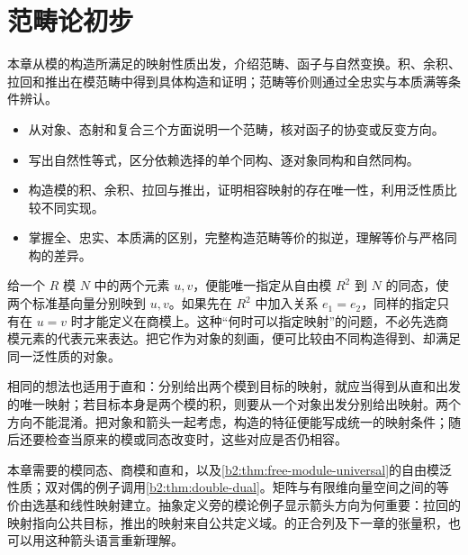 
\chapter{范畴论初步}
\label{b2:ch:05}

\begin{chapterabstract}
	本章从模的构造所满足的映射性质出发，介绍范畴、函子与自然变换。积、余积、拉回和推出在模范畴中得到具体构造和证明；范畴等价则通过全忠实与本质满等条件辨认。
\end{chapterabstract}

\begin{learninggoals}
	\begin{itemize}
		\item 从对象、态射和复合三个方面说明一个范畴，核对函子的协变或反变方向。
		\item 写出自然性等式，区分依赖选择的单个同构、逐对象同构和自然同构。
		\item 构造模的积、余积、拉回与推出，证明相容映射的存在唯一性，利用泛性质比较不同实现。
		\item 掌握全、忠实、本质满的区别，完整构造范畴等价的拟逆，理解等价与严格同构的差异。
	\end{itemize}
\end{learninggoals}

给一个 \(R\) 模 \(N\) 中的两个元素 \(u,v\)，便能唯一指定从自由模 \(R^2\) 到 \(N\) 的同态，使两个标准基向量分别映到 \(u,v\)。如果先在 \(R^2\) 中加入关系 \(e_1=e_2\)，同样的指定只有在 \(u=v\) 时才能定义在商模上。这种“何时可以指定映射”的问题，不必先选商模元素的代表元来表达。把它作为对象的刻画，便可比较由不同构造得到、却满足同一泛性质的对象。

\ProseParagraphBreak

相同的想法也适用于直和：分别给出两个模到目标的映射，就应当得到从直和出发的唯一映射；若目标本身是两个模的积，则要从一个对象出发分别给出映射。两个方向不能混淆。把对象和箭头一起考虑，构造的特征便能写成统一的映射条件；随后还要检查当原来的模或同态改变时，这些对应是否仍相容。

\ProseParagraphBreak

本章需要的模同态、商模和直和，以及\cref{b2:thm:free-module-universal}的自由模泛性质；双对偶的例子调用\cref{b2:thm:double-dual}。矩阵与有限维向量空间之间的等价由选基和线性映射建立。抽象定义旁的模论例子显示箭头方向为何重要：拉回的映射指向公共目标，推出的映射来自公共定义域。的正合列及下一章的张量积，也可以用这种箭头语言重新理解。


